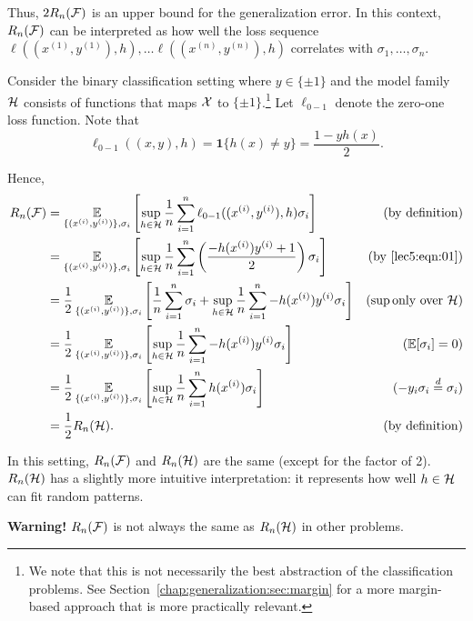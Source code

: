 Thus, $2R_n(\mathcal F)$ is an upper bound for the generalization error. In this context, $R_n(\mathcal F)$ can be interpreted as how well the loss sequence $\ell((x^{(1)}, y^{(1)}), h), \dots \ell((x^{(n)}, y^{(n)}), h)$ correlates with $\sigma_1, \dots, \sigma_n$.
\begin{example}\label{example:binary-classficiation-rc}
Consider the binary classification setting where $y \in \{\pm 1\}$ and the model family $\mathcal H$ consists of functions that maps $\mathcal X$ to $\{\pm 1\}$.\footnote{We note that this is not necessarily the best abstraction of the classification problems. See Section~\ref{chap:generalization:sec:margin} for a more margin-based approach that is more practically relevant.} 
Let $\ell_{0-1}$ denote the zero-one loss function. Note that
\begin{equation}\label{lec5:eqn:01}
    \ell_{0-1}((x,y), h) = \mathbf{1}\{h(x) \neq y\} = \frac{1-yh(x)}{2}.
\end{equation}

Hence,
\begin{align}
    R_n(\mathcal F) &= \operatorname*{\mathbb{E}}_{\{(x^{(i)}, y^{(i)})\}, \sigma_i} \left[ \sup_{h \in \mathcal H} \frac{1}{n}\sum^n_{i=1} \ell_{0-1}((x^{(i)}, y^{(i)}),h)\sigma_i \right] &(\text{by definition}) \\
    &= \operatorname*{\mathbb{E}}_{\{(x^{(i)}, y^{(i)})\}, \sigma_i} \left[ \sup_{h \in \mathcal H} \frac{1}{n}\sum^n_{i=1} \left(\frac{-h(x^{(i)})y^{(i)}+1}{2}\right)\sigma_i \right] &(\text{by } \eqref{lec5:eqn:01}) \\
    &= \frac{1}{2} \operatorname*{\mathbb{E}}_{\{(x^{(i)}, y^{(i)})\}, \sigma_i} \left[ \frac{1}{n}\sum^n_{i=1}\sigma_i + \sup_{h \in \mathcal H} \frac{1}{n}\sum^n_{i=1} -h(x^{(i)})y^{(i)}\sigma_i \right] &(\sup \text{only over } \mathcal H) \\
    &= \frac{1}{2} \operatorname*{\mathbb{E}}_{\{(x^{(i)}, y^{(i)})\}, \sigma_i} \left[\sup_{h \in \mathcal H} \frac{1}{n}\sum^n_{i=1} -h(x^{(i)})y^{(i)}\sigma_i \right] &(\operatorname*{\mathbb{E}} [\sigma_i] = 0) \\
    &=\frac{1}{2} \operatorname*{\mathbb{E}}_{\{(x^{(i)}, y^{(i)})\}, \sigma_i} \left[\sup_{h \in \mathcal H} \frac{1}{n}\sum^n_{i=1} h(x^{(i)})\sigma_i \right] &(-y_i \sigma_i \stackrel{d}{=} \sigma_i) \\
    &= \frac{1}{2}R_n(\mathcal H). &(\text{by definition})
\end{align}

In this setting, $R_n(\mathcal F)$ and $R_n(\mathcal H)$ are the same (except for the factor of 2). $R_n(\mathcal H)$ has a slightly more intuitive interpretation: it represents how well $h \in \mathcal H$ can fit random patterns.

\textbf{Warning!} $R_n(\mathcal F)$ is not always the same as $R_n(\mathcal H)$ in other problems.
\end{example}


